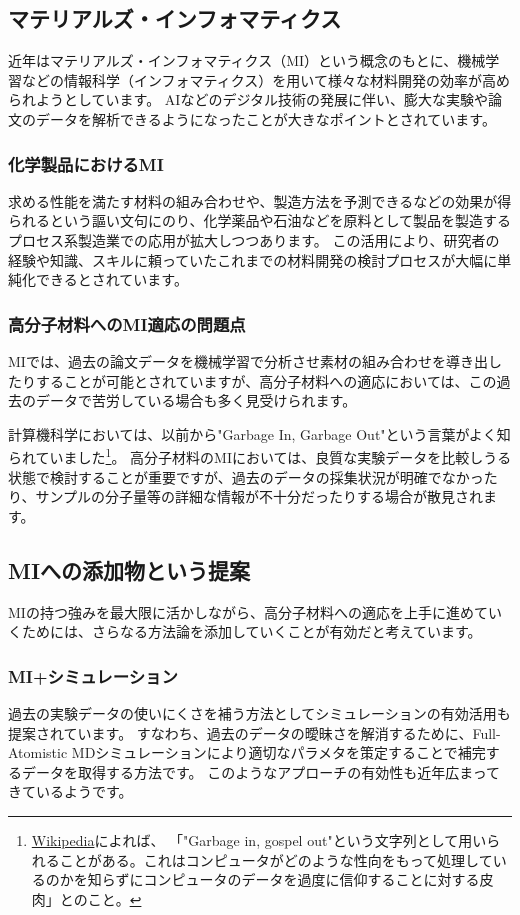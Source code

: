\documentclass[a4paper,11pt]{jlreq}
\begin{document}
\subsection{マテリアルズ・インフォマティクス}
近年はマテリアルズ・インフォマティクス（MI）という概念のもとに、機械学習などの情報科学（インフォマティクス）を用いて様々な材料開発の効率が高められようとしています。
AIなどのデジタル技術の発展に伴い、膨大な実験や論文のデータを解析できるようになったことが大きなポイントとされています。

\subsubsection{化学製品におけるMI}
求める性能を満たす材料の組み合わせや、製造方法を予測できるなどの効果が得られるという謳い文句にのり、化学薬品や石油などを原料として製品を製造するプロセス系製造業での応用が拡大しつつあります。
この活用により、研究者の経験や知識、スキルに頼っていたこれまでの材料開発の検討プロセスが大幅に単純化できるとされています。

\subsubsection{高分子材料へのMI適応の問題点}
MIでは、過去の論文データを機械学習で分析させ素材の組み合わせを導き出したりすることが可能とされていますが、高分子材料への適応においては、この過去のデータで苦労している場合も多く見受けられます。

計算機科学においては、以前から"Garbage In, Garbage Out"という言葉がよく知られていました\footnote{
    \href{https://ja.wikipedia.org/wiki/Garbage_in,_garbage_out}{Wikipedia}によれば、 「"Garbage in, gospel out"という文字列として用いられることがある。これはコンピュータがどのような性向をもって処理しているのかを知らずにコンピュータのデータを過度に信仰することに対する皮肉」とのこと。
}。
高分子材料のMIにおいては、良質な実験データを比較しうる状態で検討することが重要ですが、過去のデータの採集状況が明確でなかったり、サンプルの分子量等の詳細な情報が不十分だったりする場合が散見されます。

\subsection{MIへの添加物という提案}
MIの持つ強みを最大限に活かしながら、高分子材料への適応を上手に進めていくためには、さらなる方法論を添加していくことが有効だと考えています。
\subsubsection{MI+シミュレーション}
過去の実験データの使いにくさを補う方法としてシミュレーションの有効活用も提案されています。
すなわち、過去のデータの曖昧さを解消するために、Full-Atomistic MDシミュレーションにより適切なパラメタを策定することで補完するデータを取得する方法です。
このようなアプローチの有効性も近年広まってきているようです。
\end{document}
